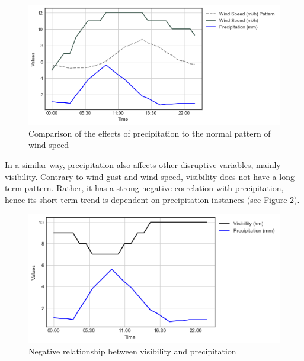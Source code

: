 \begin{figure}
  \includegraphics[width=\linewidth]{figures/figure_precip_windspeed.png}
  \caption{Comparison of the effects of precipitation to the normal pattern of wind speed}
  \label{figure_precip_windspeed}
\end{figure}



In a similar way, precipitation also affects other disruptive variables, mainly visibility. Contrary to wind gust and wind speed, visibility does not have a long-term pattern. Rather, it has a strong negative correlation with precipitation, hence its short-term trend is dependent on precipitation instances (see Figure \ref{figure_precip_visibility}).

\begin{figure}
  \includegraphics[width=\linewidth]{figures/figure_precip_visibility.png}
  \caption{Negative relationship between visibility and precipitation}
  \label{figure_precip_visibility}
\end{figure}




























